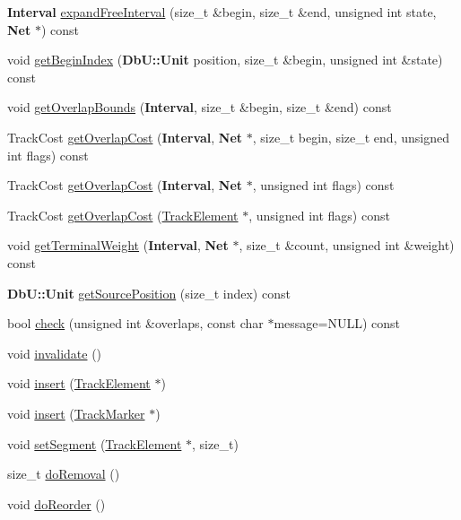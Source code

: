 \begin{DoxyCompactItemize}
\item 
{\bf Interval} \hyperlink{classKite_1_1Track_aead0aa746d8c8ce14a11161baa1aafc4}{expand\-Free\-Interval} (size\-\_\-t \&begin, size\-\_\-t \&end, unsigned int state, {\bf Net} $\ast$) const 
\item 
void \hyperlink{classKite_1_1Track_a7386d7acfcd1dfbeb906bd4c482d797e}{get\-Begin\-Index} ({\bf Db\-U\-::\-Unit} position, size\-\_\-t \&begin, unsigned int \&state) const 
\item 
void \hyperlink{classKite_1_1Track_a414e800da5aa8b03eb82aa0dba883f7f}{get\-Overlap\-Bounds} ({\bf Interval}, size\-\_\-t \&begin, size\-\_\-t \&end) const 
\item 
Track\-Cost \hyperlink{classKite_1_1Track_a91b5c29bec3f74b1194473d1eb274086}{get\-Overlap\-Cost} ({\bf Interval}, {\bf Net} $\ast$, size\-\_\-t begin, size\-\_\-t end, unsigned int flags) const 
\item 
Track\-Cost \hyperlink{classKite_1_1Track_ae8e0a72955bd05677d82738ad032526d}{get\-Overlap\-Cost} ({\bf Interval}, {\bf Net} $\ast$, unsigned int flags) const 
\item 
Track\-Cost \hyperlink{classKite_1_1Track_ac930c18bbcb0b25f2b5360f6ce6741e7}{get\-Overlap\-Cost} (\hyperlink{classKite_1_1TrackElement}{Track\-Element} $\ast$, unsigned int flags) const 
\item 
void \hyperlink{classKite_1_1Track_a8b274bcf60589230f36f9798cce1e7d7}{get\-Terminal\-Weight} ({\bf Interval}, {\bf Net} $\ast$, size\-\_\-t \&count, unsigned int \&weight) const 
\item 
{\bf Db\-U\-::\-Unit} \hyperlink{classKite_1_1Track_a6807aafaa83c1a2687c48d02510ced3a}{get\-Source\-Position} (size\-\_\-t index) const 
\item 
bool \hyperlink{classKite_1_1Track_ad21778972fbdf5cbffb470b2e36f9fcf}{check} (unsigned int \&overlaps, const char $\ast$message=N\-U\-L\-L) const 
\item 
void \hyperlink{classKite_1_1Track_a893f1101c650c08c98612515c2b1a89c}{invalidate} ()
\item 
void \hyperlink{classKite_1_1Track_aa392ba7cf1e3e485aac11cf326e31918}{insert} (\hyperlink{classKite_1_1TrackElement}{Track\-Element} $\ast$)
\item 
void \hyperlink{classKite_1_1Track_a31e8f4502866435ac898c7eec741175f}{insert} (\hyperlink{classKite_1_1TrackMarker}{Track\-Marker} $\ast$)
\item 
void \hyperlink{classKite_1_1Track_a8b5d93406ef581c1be022417238a89ca}{set\-Segment} (\hyperlink{classKite_1_1TrackElement}{Track\-Element} $\ast$, size\-\_\-t)
\item 
size\-\_\-t \hyperlink{classKite_1_1Track_abfffcd781865b94f62f27a1e7be99a38}{do\-Removal} ()
\item 
void \hyperlink{classKite_1_1Track_aaccb9224f5b38ecd8506fd1eec9ef5ca}{do\-Reorder} ()
\end{DoxyCompactItemize}
